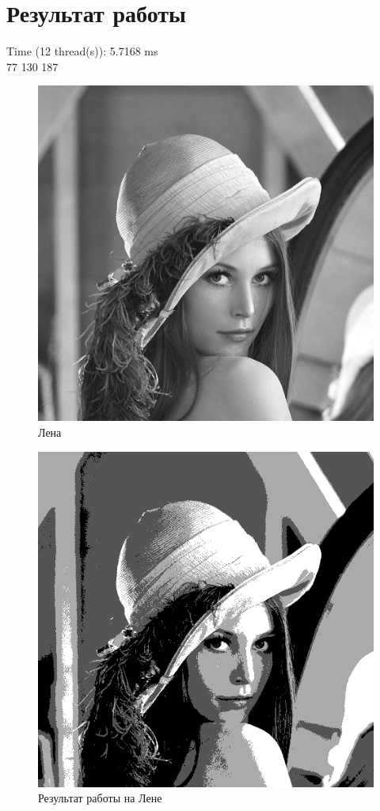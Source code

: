 \documentclass{article}
\begin{document}
  \section{Результат работы}
  Time (12 thread(s)): 5.7168 ms\\
  77 130 187
  \begin{figure}[H]
  	\includegraphics[width=1\textwidth]{pictures/in1.png}
  	\caption{Лена}
  \end{figure}
  \begin{figure}[H]
  	\includegraphics[width=1\textwidth]{pictures/out1.png}
  	\caption{Результат работы на Лене}
  \end{figure}
\end{document}
